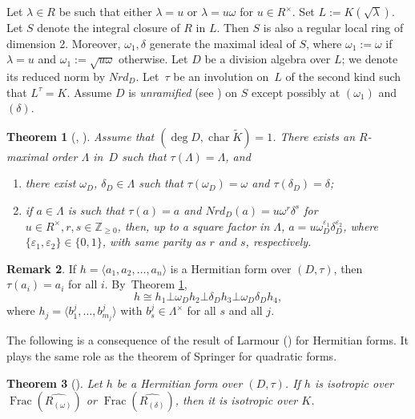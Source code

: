 \documentclass[JEP,XML,SOM,Unicode,NoFloatCountersInSection,published]{cedram}
\DeclareMathOperator{\Char}{char}
\DeclareMathOperator{\Frac}{Frac}
\let\epsilon\varepsilon
\let\<\langle
\let\>\rangle
\newtheorem{thm}{Theorem}[section]
\theoremstyle{definition}
\newtheorem{rem}[thm]{Remark}
\begin{document}
Let $\lambda \in R$ be such that either $\lambda=u$ or $\lambda=u\omega$ for $u \in R^{\times}$. Set $L:=K(\sqrt{\lambda})$. Let $S$ denote the integral closure of $R$ in $L$. Then $S$ is also a regular local ring of dimension 2. Moreover, $\omega_1, \delta$ generate the maximal ideal of $S$, where $\omega_1:=\omega$ if $\lambda=u$ and $\omega_1:=\sqrt{u\omega}$ otherwise.
Let $D$ be a division algebra over $L$; we denote its reduced norm by $Nrd_D$. Let~$\tau$ be an involution on~$L$ of the second kind such that $L^{\tau}=K$.
Assume $D$ is \emph{unramified} (see \cite[p.\,4]{parsur}) on $S$ except possibly at $(\omega_1)$ and $(\delta)$.

\begin{thm}[{\cite[Lem.\,3.7]{wu}, \cite[Lem.\,9.3]{parsur}}] \label{7.4.1} Assume that $(\deg{D}, \Char \widetilde{K})=1$. There exists an $R$-maximal order $\Lambda$ in~$D$ such that
$\tau(\Lambda)=\Lambda$, and
\begin{enumerate}
\item there exist $\omega_D$, $\delta_D \in \Lambda$ such that $\tau(\omega_D)=\omega$ and $\tau(\delta_D)=\delta$;
\item if $a \in \Lambda$ is such that $\tau(a)=a$ and $Nrd_D(a)=u \omega^r \delta^s$ for $u \in R^{\times}, r,s \in \mathbb{Z}_{\geqslant 0}$, then, up to a square factor in $\Lambda$, $a=u \omega_D^{\epsilon_1} \delta_D^{\epsilon_2}$, where $\{\epsilon_1, \epsilon_2\} \in \{0,1\}$, with same parity as $r$ and $s$, respectively.
\end{enumerate}
\end{thm}

\begin{rem}{\label{7.4.2}} If $h=\<a_1, a_2, \dots, a_n\>$ is a Hermitian form over $(D, \tau)$, then \hbox{$\tau(a_i)=a_i$} for all $i$. By~Theorem \ref{7.4.1},
\[
h \cong h_1 \bot \omega_D h_2 \bot \delta_D h_3 \bot \omega_D \delta_D h_4,
\]
where $h_j=\< b_{1}^j,\dots, b_{m_j}^j\>$ with $b_{s}^j \in \Lambda^{\times}$ for all $s$ and all $j$.
\end{rem}
The following is a consequence of the result of Larmour (\cite{larmour}) for Hermitian forms. It plays the same role as the theorem of Springer for quadratic forms.
\begin{thm}[{\cite[Cor.\,9.5]{parsur}}] \label{7.4.3}
Let $h$ be a Hermitian form over $(D, \tau)$. If $h$ is isotropic over $\Frac(\widehat{R_{(\omega)}})$ or $\Frac(\widehat{R_{(\delta)}})$, then it is isotropic over $K$.
\end{thm}
\end{document}
